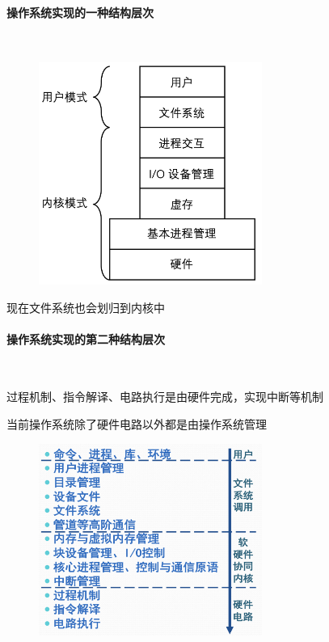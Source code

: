 \documentclass[cs4size,a4paper,10pt]{ctexart}
\begin{document}
		\paragraph{操作系统实现的一种结构层次}~{}

		\begin{figure}[H]
			\centering
			\includegraphics[width=0.65\textwidth]{img/1.3.6.1}
		\end{figure}
		现在文件系统也会划归到内核中

		\paragraph{操作系统实现的第二种结构层次}~{}

		过程机制、指令解译、电路执行是由硬件完成，实现中断等机制

		当前操作系统除了硬件电路以外都是由操作系统管理
		
		\begin{figure}[H]
			\centering
			\includegraphics[width=0.65\textwidth]{img/1.3.6.2}
		\end{figure}
\end{document}
